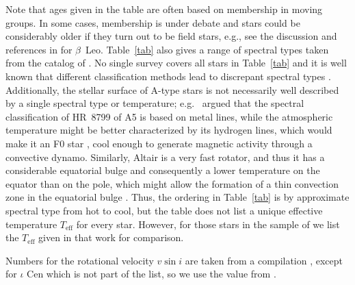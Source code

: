 \documentclass[linenumbers]{aastex631}
\begin{document}
Note that ages given in the table are often based on membership in moving groups. In some cases, membership is under debate and stars could be considerably older if they turn out to be field stars, e.g., see the discussion and references in \citet{2021AJ....161..186D} for $\beta$~Leo. Table~\ref{tab} also gives a range of spectral types taken from the catalog of \citet[][see there for a full list of spectral type references]{2014yCat....1.2023S}. 
No single survey covers all stars in Table~\ref{tab} and it is well known that different classification methods lead to discrepant spectral types  \citep[e.g.,][]{1989ApJS...70..623G}.
Additionally, the stellar surface of A-type stars is not necessarily well described by a single spectral type or temperature; e.g.\ \citet{2010A&A...516A..38R} argued that the
spectral classification of HR~8799 of A5 is based on metal lines,
while the atmospheric temperature might be better characterized by its
hydrogen lines, which would make it an F0 star
\citep{1999AJ....118.2993G}, cool enough to generate magnetic activity
through a convective dynamo. Similarly,  Altair is a very fast rotator, and thus it has a considerable equatorial bulge and consequently a lower temperature on the equator than on the pole, which might allow the formation of a thin convection zone in the equatorial bulge \citep{2009A&A...497..511R}. Thus, the ordering in Table~\ref{tab} is by approximate spectral type from hot to cool, but the table does not list a unique effective temperature $T_\mathrm{eff}$ for every star. However, for those stars in the sample of \citet{2002ApJ...579..800S} we list the $T_\mathrm{eff}$ given in that work for comparison.

Numbers for the rotational velocity $v \sin i$ are taken from a compilation \citep{2002A&A...393..897R}, except for $\iota$ Cen which is not part of the list, so we use the value from \cite{2002ApJ...579..800S}.
\end{document}
